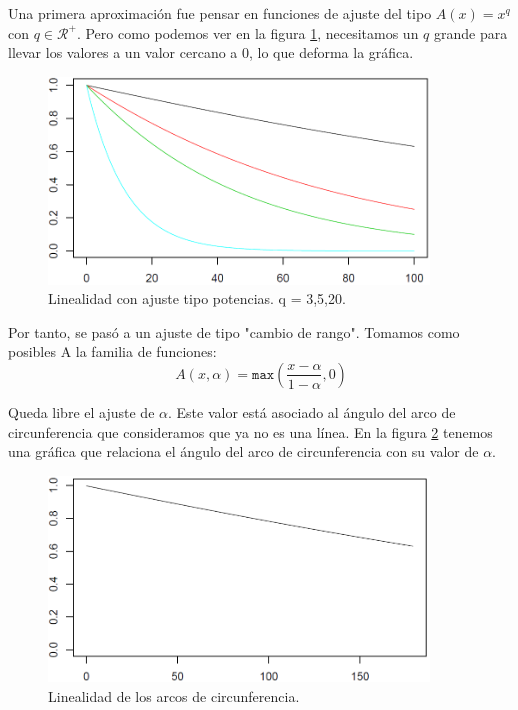 Una primera aproximación fue pensar en funciones de ajuste del tipo $A(x) = x^q$ con $q \in \mathcal{R}^+$. Pero como podemos ver en la figura \ref{fig3}, necesitamos un $q$ grande para llevar los valores a un valor cercano a 0, lo que deforma la gráfica.\\

\begin{figure}[H]
\begin{center}

\includegraphics[width=0.9\textwidth]{img/Ajuste-q.png}
\end{center}

\caption{Linealidad con ajuste tipo potencias. q = 3,5,20.}
\label{fig3}
\end{figure}

Por tanto, se pasó a un ajuste de tipo "cambio de rango". Tomamos como posibles A la familia de funciones:\\

\[
\ A(x,\alpha) = \texttt{max}\left(\frac{x-\alpha}{1-\alpha} ,0\right)
\]

Queda libre el ajuste de $\alpha$. Este valor está asociado al ángulo del arco de circunferencia que consideramos que ya no es una línea. En la figura \ref{fig4} tenemos una gráfica que relaciona el ángulo del arco de circunferencia con su valor de $\alpha$.\\

\begin{figure}[H]
\begin{center}

\includegraphics[width=0.9\textwidth]{img/experimento-angulo.png}
\end{center}

\caption{Linealidad de los arcos de circunferencia.}
\label{fig4}
\end{figure}

